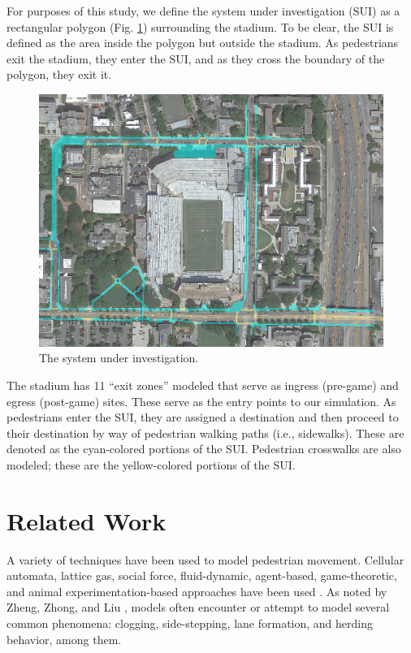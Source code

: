 \documentclass[12pt]{article}
\begin{document}
For purposes of this study, we define the system under investigation (SUI) as a
rectangular polygon (Fig. \ref{fig:polygon}) surrounding the stadium. To be
clear, the SUI is defined as the area inside the polygon but outside the
stadium. As pedestrians exit the stadium, they enter the SUI, and as they cross
the boundary of the polygon, they exit it.

\begin{figure}[H]
  \includegraphics[width=\linewidth,natwidth=1023,natheight=750]{GATechMap_20160301.png}
  \caption{The system under investigation.}
  \label{fig:polygon}
\end{figure}

The stadium has 11 ``exit zones'' modeled that serve as ingress (pre-game) and
egress (post-game) sites. These serve as the entry points to our simulation. As
pedestrians enter the SUI, they are assigned a destination and then proceed
to their destination by way of pedestrian walking paths (i.e., sidewalks).
These are denoted as the cyan-colored portions of the SUI.  Pedestrian crosswalks
are also modeled; these are the yellow-colored portions of the SUI.

\section{Related Work}
\label{sec:literature}

A variety of techniques have been used to model pedestrian movement. Cellular
automata, lattice gas, social force, fluid-dynamic, agent-based, game-theoretic,
and animal experimentation-based approaches have been used
\cite{zheng2009modeling}. As noted by Zheng, Zhong, and Liu
\cite{zheng2009modeling}, models often encounter or attempt to model several
common phenomena: clogging, side-stepping, lane formation, and herding
behavior, among them.
\end{document}
